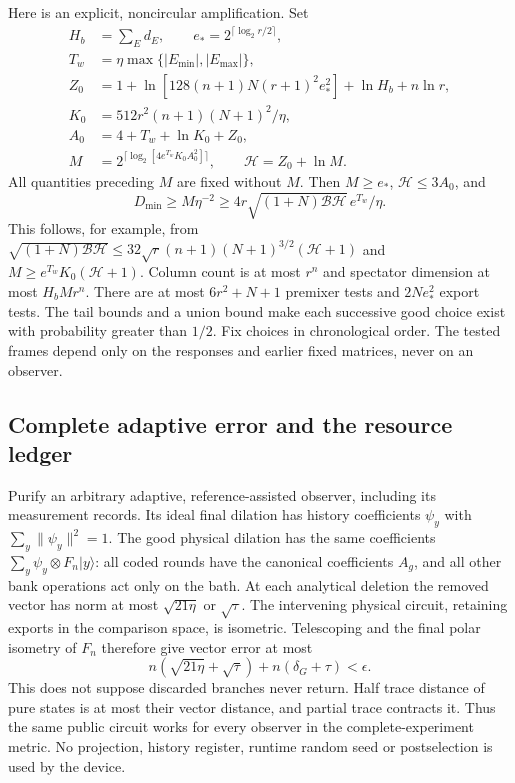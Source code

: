 Here is an explicit, noncircular amplification. Set
\begin{align*}
 H_b&=\sum_Ed_E,\qquad e_*=2^{\lceil\log_2r/2\rceil},\\
 T_w&=\eta\max\{|E_{\min}|,|E_{\max}|\},\\
 Z_0&=1+\ln[128(n+1)N(r+1)^2e_*^2]+\ln H_b+n\ln r,\\
 K_0&=512r^2(n+1)(N+1)^2/\eta,\\
 A_0&=4+T_w+\ln K_0+Z_0,\\
 M&=2^{\lceil\log_2[4e^{T_w}K_0A_0^2]\rceil},\qquad
 \mathcal H=Z_0+\ln M.
\end{align*}
All quantities preceding $M$ are fixed without $M$.
Then $M\geq e_*$, $\mathcal H\leq3A_0$, and
\[
 D_{\min}\geq M\eta^{-2}\geq
 4r\sqrt{(1+N)\mathcal B\mathcal H}\,e^{T_w}/\eta.
\]
This follows, for example, from
$\sqrt{(1+N)\mathcal B\mathcal H}
\leq32\sqrt r(n+1)(N+1)^{3/2}(\mathcal H+1)$ and
$M\geq e^{T_w}K_0(\mathcal H+1)$.
Column count is at most $r^n$ and spectator dimension at most $H_bMr^n$.
There are at most $6r^2+N+1$ premixer tests and $2Ne_*^2$ export tests.
The tail bounds and a union bound make each successive good choice
exist with probability greater than $1/2$. Fix choices in chronological
order. The tested frames depend only on the responses and earlier
fixed matrices, never on an observer.

\subsection{Complete adaptive error and the resource ledger}
Purify an arbitrary adaptive, reference-assisted observer, including its
measurement records. Its ideal final dilation has history coefficients
$\psi_y$ with $\sum_y\|\psi_y\|^2=1$. The good physical dilation has
the same coefficients $\sum_y\psi_y\otimes F_n|y\rangle$:
all coded rounds have the canonical coefficients $A_g$, and all
other bank operations act only on the bath. At each analytical deletion
the removed vector has norm at most $\sqrt{21\eta}$ or $\sqrt\tau$.
The intervening physical circuit, retaining exports in the comparison
space, is isometric. Telescoping and the final polar isometry of $F_n$
therefore give vector error at most
\[
 n(\sqrt{21\eta}+\sqrt\tau)+n(\delta_G+\tau)<\epsilon.
\]
This does not suppose discarded branches never return. Half trace
distance of pure states is at most their vector distance, and partial
trace contracts it. Thus the same public circuit works for every
observer in the complete-experiment metric. No projection, history
register, runtime random seed or postselection is used by the device.

